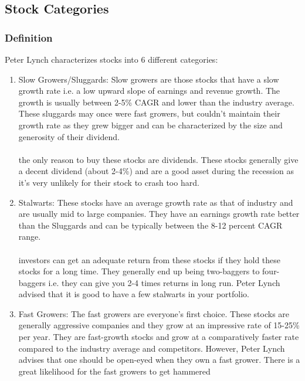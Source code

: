 \subsection{Stock Categories}

\subsubsection{Definition}

Peter Lynch characterizes stocks into 6 different categories:
\begin{enumerate}
    \item Slow Growers/Sluggards: Slow growers are those stocks that have a slow 
        growth rate i.e. a low upward slope of earnings and revenue growth. The 
        growth is usually between 2-5\% CAGR and lower than the industry average. 
        These sluggards may once were fast growers, but couldn’t maintain their 
        growth rate as they grew bigger and can be characterized by the size and 
        generosity of their dividend.\\\\
        the only reason to buy these stocks are dividends. These stocks generally 
        give a decent dividend (about 2-4\%) and are a good asset during the 
        recession as it’s very unlikely for their stock to crash too hard.
    \item Stalwarts: These stocks have an average growth rate as that of industry 
        and are usually mid to large companies. They have an earnings growth 
        rate better than the Sluggards and can be typically between the 8-12 percent 
        CAGR range.\\\\
        investors can get an adequate return from these stocks if they hold 
        these stocks for a long time. They generally end up being two-baggers to 
        four-baggers i.e. they can give you 2-4 times returns in long run. Peter 
        Lynch advised that it is good to have a few stalwarts in your portfolio.
    \item Fast Growers: The fast growers are everyone’s first choice. These stocks 
        are generally aggressive companies and they grow at an impressive rate of 
        15-25\% per year. They are fast-growth stocks and grow at a comparatively 
        faster rate compared to the industry average and competitors. However, 
        Peter Lynch advises that one should be open-eyed when they own a fast 
        grower. There is a great likelihood for the fast growers to get hammered 

\end{enumerate}
